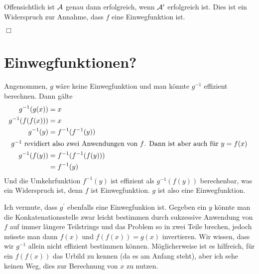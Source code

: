 \documentclass{../crypto}
\begin{document}
Offensichtlich ist $\mathcal{A}$ genau dann
erfolgreich, wenn $\mathcal{A}^\prime$ erfolgreich ist. Dies ist ein Widerspruch
zur Annahme, dass $f$ eine Einwegfunktion ist.

\hfill{}$\Box$


\section{Einwegfunktionen?}

Angenommen, $g$ wäre keine Einwegfunktion und man könnte $g^{-1}$ effizient
berechnen. Dann gälte 
\begin{align*}
   g^{-1}(g(x)) &= x \\
   g^{-1}(f(f(x))) &= x \\
   g^{-1}(y) &= f^{-1}(f^{-1}(y)) \\
   \intertext{
      $g^{-1}$ revidiert also zwei Anwendungen von $f$. Dann ist aber auch
      für $y=f(x)$
   }
   g^{-1}(f(y)) &= f^{-1}(f^{-1}(f(y))) \\
                &= f^{-1}(y)
\end{align*}
Und die Umkehrfunktion $f^{-1}(y)$ ist effizient als $g^{-1}(f(y))$ berechenbar,
was ein Widerspruch ist, denn $f$ ist Einwegfunktion. $g$ ist also eine
Einwegfunktion.

Ich vermute, dass $g^\prime$ ebenfalls eine Einwegfunkion ist. Gegeben ein $y$
könnte man die Konkatenationsstelle zwar leicht bestimmen durch sukzessive
Anwendung von $f$ auf immer längere Teilstrings und das Problem so in zwei Teile
brechen, jedoch müsste man dann $f(x)$ und $f(f(x)) = g(x)$ invertieren. Wir
wissen, dass wir $g^{-1}$ allein nicht effizient bestimmen können. Möglicherweise ist
es hilfreich, für ein $f(f(x))$ das Urbild zu kennen (da es am Anfang steht),
aber ich sehe keinen Weg, dies zur Berechnung von $x$ zu nutzen.
\end{document}
